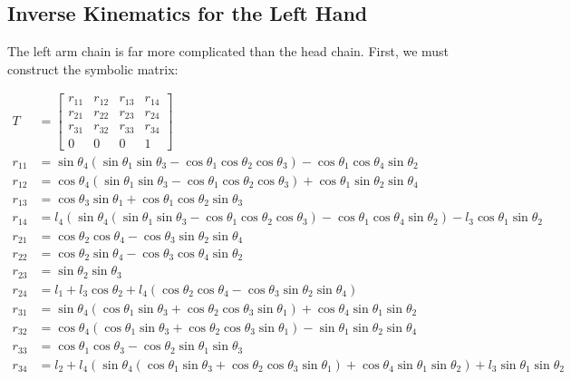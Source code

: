 \subsection{Inverse Kinematics for the Left Hand}
The left arm chain is far more complicated than the head chain. First, we must construct the symbolic matrix:\\
\begin{small}
\begin{align*}
T &= \begin{bmatrix}
r_{11} & r_{12} & r_{13} & r_{14}\\
r_{21} & r_{22} & r_{23} & r_{24}\\
r_{31} & r_{32} & r_{33} & r_{34}\\
0 & 0 & 0 & 1
\end{bmatrix}\\
r_{11} &= \sin\theta_4\left(\sin\theta_1\sin\theta_3 - \cos\theta_1\cos\theta_2\cos\theta_3\right) - \cos\theta_1\cos\theta_4\sin\theta_2\\
r_{12} &= \cos\theta_4\left(\sin\theta_1\sin\theta_3 - \cos\theta_1\cos\theta_2\cos\theta_3\right) + \cos\theta_1\sin\theta_2\sin\theta_4\\
r_{13} &= \cos\theta_3\sin\theta_1 + \cos\theta_1\cos\theta_2\sin\theta_3\\
r_{14} &= l_4\left(\sin\theta_4\left(\sin\theta_1\sin\theta_3 - \cos\theta_1\cos\theta_2\cos\theta_3\right) - \cos\theta_1\cos\theta_4\sin\theta_2\right) - l_3\cos\theta_1\sin\theta_2\\
r_{21} &= \cos\theta_2\cos\theta_4 - \cos\theta_3\sin\theta_2\sin\theta_4\\
r_{22} &= \cos\theta_2\sin\theta_4 - \cos\theta_3\cos\theta_4\sin\theta_2\\
r_{23} &= \sin\theta_2\sin\theta_3\\
r_{24} &= l_1 + l_3\cos\theta_2 + l_4\left(\cos\theta_2\cos\theta_4 - \cos\theta_3\sin\theta_2\sin\theta_4\right)\\
r_{31} &= \sin\theta_4\left(\cos\theta_1\sin\theta_3 + \cos\theta_2\cos\theta_3\sin\theta_1\right) + \cos\theta_4\sin\theta_1\sin\theta_2\\
r_{32} &= \cos\theta_4\left(\cos\theta_1\sin\theta_3 + \cos\theta_2\cos\theta_3\sin\theta_1\right) - \sin\theta_1\sin\theta_2\sin\theta_4\\
r_{33} &= \cos\theta_1\cos\theta_3 - \cos\theta_2\sin\theta_1\sin\theta_3\\
r_{34} &= l_2 + l_4\left(\sin\theta_4\left(\cos\theta_1\sin\theta_3 + \cos\theta_2\cos\theta_3\sin\theta_1\right) + \cos\theta_4\sin\theta_1\sin\theta_2\right) + l_3\sin\theta_1\sin\theta_2
\end{align*}
\end{small}\\
